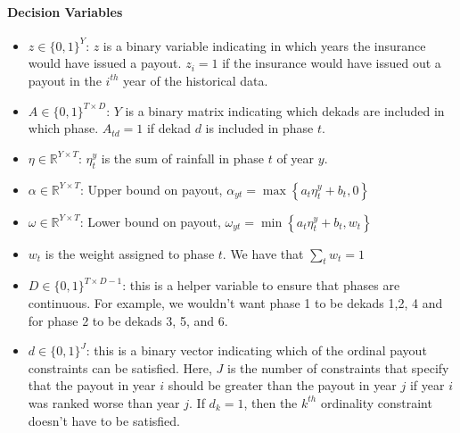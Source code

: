 \documentclass[11pt]{article}
\begin{document}
    \paragraph{Decision Variables}
      \begin{itemize}
        \item $z \in \{ 0,1\}^Y$: $z$ is a binary variable indicating in which years the insurance would have issued a payout. $z_i = 1$ if the insurance would have issued out a payout in the $i^{th}$ year of the historical data.
        \item $A \in \{ 0,1\}^{T \times D}$: $Y$ is a binary matrix indicating which dekads are included in which phase. $A_{td} = 1$ if dekad $d$ is included in phase $t$. 
        \item $\eta \in \mathbb{R}^{Y \times T}$: $\eta^y_t$ is the sum of rainfall in phase $t$ of year $y$. 
        \item $\alpha \in \mathbb{R}^{Y \times T}$: Upper bound on payout, $\alpha_{yt} = \max \left \{ a_t \eta^y_t + b_t, 0 \right \}$
        \item $\omega \in \mathbb{R}^{Y \times T}$: Lower bound on payout, $\omega_{yt} = \min \left \{ a_t \eta^y_t + b_t, w_t \right \}$
        \item $w_t$ is the weight assigned to phase $t$. We have that $\sum_t w_t = 1$ 
        \item $D \in \{ 0,1\}^{T \times D-1}$: this is a helper variable to ensure that phases are continuous. For example, we wouldn't want phase 1 to be dekads 1,2, 4 and for phase 2 to be dekads 3, 5, and 6. 
        \item $d \in \{ 0,1\}^{J}$: this is a binary vector indicating which of the ordinal payout constraints can be satisfied. Here, $J$ is the number of constraints that specify that the payout in year $i$ should be greater than the payout in year $j$ if year $i$ was ranked worse than year $j$. If $d_k=1$, then the $k^{th}$ ordinality constraint doesn't have to be satisfied. 
      \end{itemize}
    
\end{document}
